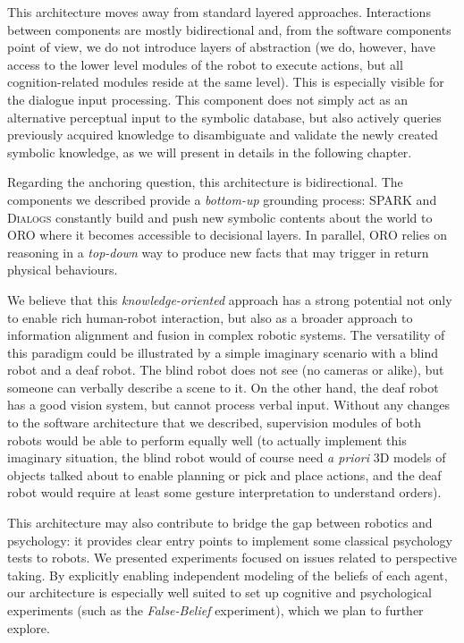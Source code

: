 This architecture moves away from standard layered approaches. Interactions
between components are mostly bidirectional and, from the software components
point of view, we do not introduce layers of abstraction (we do, however, have
access to the lower level modules of the robot to execute actions, but all
cognition-related modules reside at the same level). This is especially visible
for the dialogue input processing. This component does not simply act as an
alternative perceptual input to the symbolic database, but also actively
queries previously acquired knowledge to disambiguate and validate the newly
created symbolic knowledge, as we will present in details in the following
chapter.

Regarding the anchoring question, this architecture is bidirectional. The
components we described provide a \textit{bottom-up} grounding process: SPARK
and \textsc{Dialogs} constantly build and push new symbolic contents about the
world to ORO where it becomes accessible to decisional layers. In parallel, ORO
relies on reasoning in a \textit{top-down} way to produce new facts that may
trigger in return physical behaviours. 

We believe that this \emph{knowledge-oriented} approach has a strong potential
not only to enable rich human-robot interaction, but also as a broader approach
to information alignment and fusion in complex robotic systems.  The
versatility of this paradigm could be illustrated by a simple imaginary
scenario with a blind robot and a deaf robot. The blind robot does not see (no
cameras or alike), but someone can verbally describe a scene to it. On the
other hand, the deaf robot has a good vision system, but cannot process verbal
input.  Without any changes to the software architecture that we described,
supervision modules of both robots would be able to perform equally well (to
actually implement this imaginary situation, the blind robot would of course
need \textit{a priori} 3D models of objects talked about to enable planning or
pick and place actions, and the deaf robot would require at least some gesture
interpretation to understand orders).

This architecture may also contribute to bridge the gap between robotics and
psychology: it provides clear entry points to implement some classical
psychology tests to robots. We presented experiments focused on issues related
to perspective taking. By explicitly enabling independent modeling of the
beliefs of each agent, our architecture is especially well suited to set up
cognitive and psychological experiments (such as the \emph{False-Belief}
experiment), which we plan to further explore.
